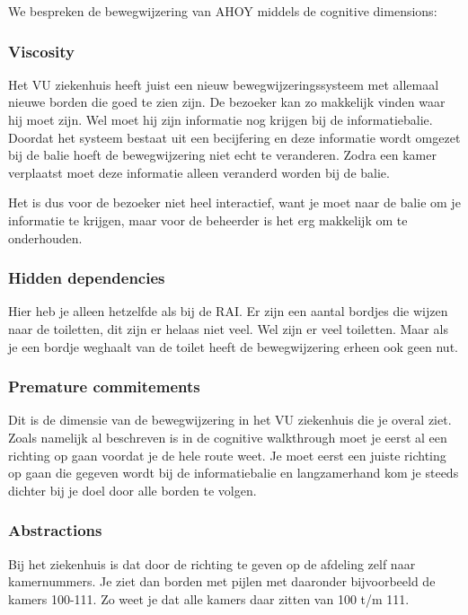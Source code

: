 We bespreken de bewegwijzering van AHOY middels de cognitive dimensions:


\subsubsection{Viscosity}

Het VU ziekenhuis heeft juist een nieuw bewegwijzeringssysteem met allemaal nieuwe borden die goed te zien zijn. De bezoeker kan zo makkelijk vinden waar hij moet zijn. Wel moet hij zijn informatie nog krijgen bij de informatiebalie. Doordat het systeem bestaat uit een becijfering en deze informatie wordt omgezet bij de balie hoeft de bewegwijzering niet echt te veranderen. Zodra een kamer verplaatst moet deze informatie alleen veranderd worden bij de balie.

Het is dus voor de bezoeker niet heel interactief, want je moet naar de balie om je informatie te krijgen, maar voor de beheerder is het erg makkelijk om te onderhouden.


\subsubsection{Hidden dependencies}

Hier heb je alleen hetzelfde als bij de RAI. Er zijn een aantal bordjes die wijzen naar de toiletten, dit zijn er helaas niet veel. Wel zijn er veel toiletten. Maar als je een bordje weghaalt van de toilet heeft de bewegwijzering erheen ook geen nut.


\subsubsection{Premature commitements}

Dit is de dimensie van de bewegwijzering in het VU ziekenhuis die je overal ziet. Zoals namelijk al beschreven is in de cognitive walkthrough moet je eerst al een richting op gaan voordat je de hele route weet. Je moet eerst een juiste richting op gaan die gegeven wordt bij de informatiebalie en langzamerhand kom je steeds dichter bij je doel door alle borden te volgen.


\subsubsection{Abstractions}

Bij het ziekenhuis is dat door de richting te geven op de afdeling zelf naar kamernummers. Je ziet dan borden met pijlen met daaronder bijvoorbeeld de kamers 100-111. Zo weet je dat alle kamers daar zitten van 100 t/m 111.


